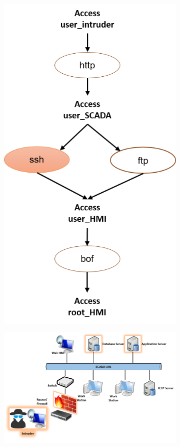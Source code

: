 \begin{figure}[htbp]
\begin{subfigure}{0.12\textwidth}
	\includegraphics[width=\textwidth]{C-graph.png}
	\caption{}\label{sfig:graph-C}
	\end{subfigure}
	\begin{subfigure}{0.33\textwidth}
	\includegraphics[width=\textwidth]{CC-model.png}

\end{subfigure}
\end{figure}
